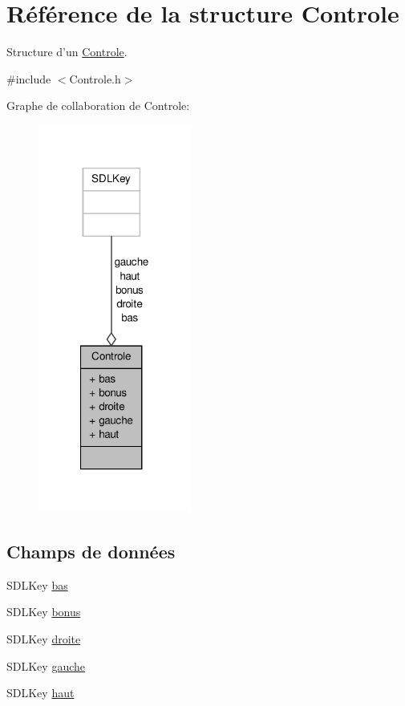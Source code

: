 \hypertarget{structControle}{\section{Référence de la structure Controle}
\label{structControle}
}


Structure d'un \hyperlink{structControle}{Controle}.  




{\ttfamily \#include $<$Controle.\-h$>$}



Graphe de collaboration de Controle\-:\nopagebreak
\begin{figure}[H]
\begin{center}
\leavevmode
\includegraphics[width=143pt]{structControle__coll__graph}
\end{center}
\end{figure}
\subsection*{Champs de données}
\begin{DoxyCompactItemize}
\item 
S\-D\-L\-Key \hyperlink{structControle_a5b5c96bf02d58115b53eaa683f372faf}{bas}
\item 
S\-D\-L\-Key \hyperlink{structControle_ad6ce9209cfccf9b61fbaf5bc149b64e9}{bonus}
\item 
S\-D\-L\-Key \hyperlink{structControle_a1178797db7b9f5956c553feea90b828d}{droite}
\item 
S\-D\-L\-Key \hyperlink{structControle_ae86d63d5b63cd831f57ce8383d5488af}{gauche}
\item 
S\-D\-L\-Key \hyperlink{structControle_a515a70782a9e7e6f5fbf9f99815b5ae2}{haut}
\end{DoxyCompactItemize}


